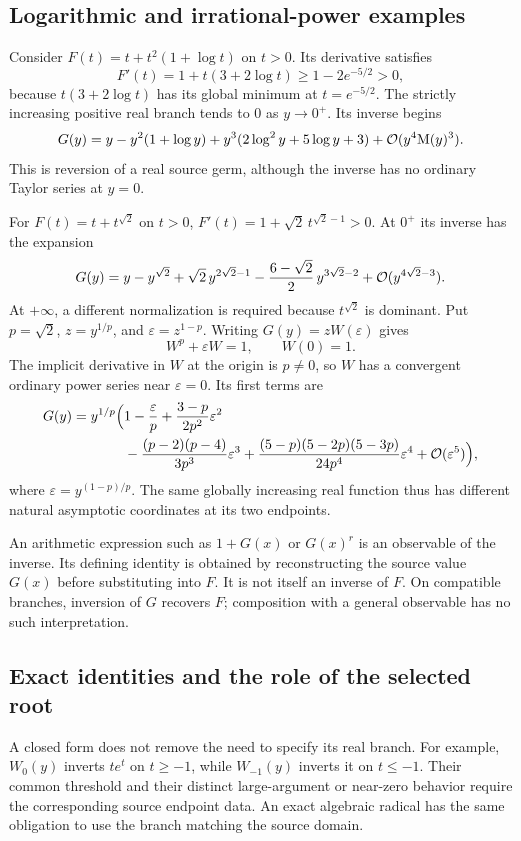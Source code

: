 \subsection{Logarithmic and irrational-power examples}

Consider $F(t)=t+t^2(1+\log t)$ on $t>0$. Its derivative satisfies
\[
 F'(t)=1+t(3+2\log t)\ge1-2e^{-5/2}>0,
\]
because $t(3+2\log t)$ has its global minimum at $t=e^{-5/2}$.
The strictly increasing positive real branch tends to $0$ as $y\to0^+$.
Its inverse begins
\[
 G(y)=y-y^2(1+\log y)
 +y^3(2\log^2y+5\log y+3)
 +\mathcal O(y^4\mathrm M(y)^3).
\]
This is reversion of a real source germ, although the inverse has no
ordinary Taylor series at $y=0$.

For $F(t)=t+t^{\sqrt2}$ on $t>0$,
$F'(t)=1+\sqrt2\,t^{\sqrt2-1}>0$. At $0^+$ its inverse has the expansion
\[
 G(y)=y-y^{\sqrt2}+\sqrt2\,y^{2\sqrt2-1}
 -\frac{6-\sqrt2}{2}\,y^{3\sqrt2-2}
 +\mathcal O(y^{4\sqrt2-3}).
\]
At $+\infty$, a different normalization is required because $t^{\sqrt2}$
is dominant. Put $p=\sqrt2$, $z=y^{1/p}$, and $\varepsilon=z^{1-p}$.
Writing $G(y)=zW(\varepsilon)$ gives
\[
 W^p+\varepsilon W=1,\qquad W(0)=1.
\]
The implicit derivative in $W$ at the origin is $p\ne0$, so $W$ has a
convergent ordinary power series near $\varepsilon=0$. Its first terms are
\begin{align*}
 G(y)=y^{1/p}\Bigl(&
 1-\frac{\varepsilon}{p}
 +\frac{3-p}{2p^2}\varepsilon^2\\
 &{}
 -\frac{(p-2)(p-4)}{3p^3}\varepsilon^3
 +\frac{(5-p)(5-2p)(5-3p)}{24p^4}\varepsilon^4
 +\mathcal O(\varepsilon^5)\Bigr),
\end{align*}
where $\varepsilon=y^{(1-p)/p}$.
The same globally increasing real function thus has different natural
asymptotic coordinates at its two endpoints.

An arithmetic expression such as $1+G(x)$ or $G(x)^r$ is an observable
of the inverse. Its defining identity is obtained by reconstructing the
source value $G(x)$ before substituting into $F$. It is not itself an
inverse of $F$. On compatible branches, inversion of $G$ recovers $F$;
composition with a general observable has no such interpretation.

\subsection{Exact identities and the role of the selected root}

A closed form does not remove the need to specify its real branch.
For example, $W_0(y)$ inverts $t e^t$ on $t\ge-1$, while $W_{-1}(y)$
inverts it on $t\le-1$. Their common threshold and their distinct
large-argument or near-zero behavior require the corresponding source
endpoint data. An exact algebraic radical has the same obligation to use
the branch matching the source domain.

